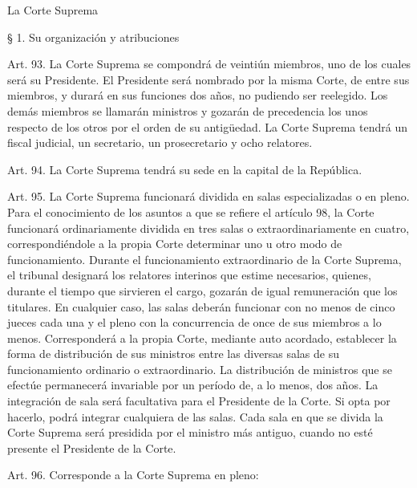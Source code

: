     La Corte Suprema


    § 1. Su organización y atribuciones


    Art. 93. La Corte Suprema se compondrá de veintiún miembros, uno de los cuales será su Presidente.
    El Presidente será nombrado por la misma Corte, de entre sus miembros, y durará en sus funciones dos años, no pudiendo ser reelegido.
    Los demás miembros se llamarán ministros y gozarán de precedencia los unos respecto de los otros por el orden de su antigüedad.
    La Corte Suprema tendrá un fiscal judicial, un secretario, un prosecretario y ocho relatores.


    Art. 94. La Corte Suprema tendrá su sede en la capital de la República.


    Art. 95. La Corte Suprema funcionará dividida en salas especializadas o en pleno.
    Para el conocimiento de los asuntos a que se refiere el artículo 98, la Corte funcionará ordinariamente dividida en tres salas o extraordinariamente en cuatro, correspondiéndole a la propia Corte determinar uno u otro modo de funcionamiento.
    Durante el funcionamiento extraordinario de la Corte Suprema, el tribunal designará los relatores interinos que estime necesarios, quienes, durante el tiempo que sirvieren el cargo, gozarán de igual remuneración que los titulares.
    En cualquier caso, las salas deberán funcionar con no menos de cinco jueces cada una y el pleno con la concurrencia de once de sus miembros a lo menos.
    Corresponderá a la propia Corte, mediante auto acordado, establecer la forma de distribución de sus ministros entre las diversas salas de su funcionamiento ordinario o extraordinario. La distribución de ministros que se efectúe permanecerá invariable por un período de, a lo menos, dos años.
    La integración de sala será facultativa para el Presidente de la Corte. Si opta por hacerlo, podrá integrar cualquiera de las salas.
    Cada sala en que se divida la Corte Suprema será presidida por el ministro más antiguo, cuando no esté presente el Presidente de la Corte.



    Art. 96. Corresponde a la Corte Suprema en pleno:

